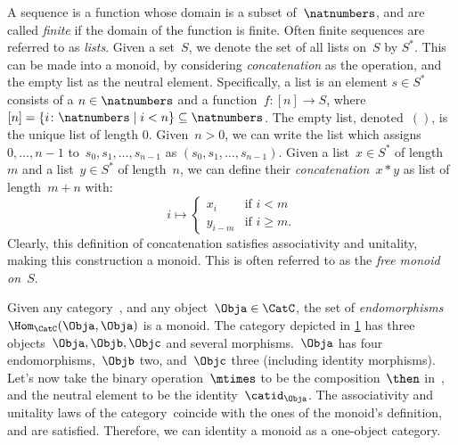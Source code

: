 \begin{example}[Sequences]
  A sequence is a function whose domain is a subset of~$\natnumbers$, and are called \emph{finite} if the domain of the function is finite. Often finite sequences are referred to as \emph{lists}. Given a set~$S$, we denote the set of all lists on~$S$ by $S^\ast$. This can be made into a monoid, by considering \emph{concatenation} as the operation, and the empty list as the neutral element. Specifically, a list is an element $s\in S^\ast$ consists of a $n\in \natnumbers$ and a function~$f\colon [n]\to S$, where~$[n]=\{i\colon \natnumbers\mid i<n\}\subseteq \natnumbers$. The empty list, denoted~$()$, is the unique list of length 0. Given~$n>0$, we can write the list which assigns~$0,\ldots,n-1$ to~$s_0,s_1,\ldots,s_{n-1}$ as $(s_0,s_1,\ldots,s_{n-1})$. Given a list~$x\in S^\ast$ of length~$m$ and a list~$y\in S^\ast$ of length~$n$, we can define their \emph{concatenation}~$x*y$ as list of length~$m+n$ with:
  \begin{equation*}
    i\mapsto
    \begin{cases}
      x_i&\text{if }i<m\\
      y_{i-m}&\text{if }i\geq m.
    \end{cases}
  \end{equation*}
  Clearly, this definition of concatenation satisfies associativity and unitality, making this construction a monoid. This is often referred to as the \emph{free monoid on~$S$}.
\end{example}

\begin{example}
  Given any category~\CatC, and any object~$\Obja\in \CatC$, the set of \emph{endomorphisms}~$\Hom_{\CatC}(\Obja,\Obja)$ is a monoid. The category depicted in \cref{fig:monoid_endomorphisms} has three objects~$\Obja,\Objb,\Objc$ and several morphisms.~$\Obja$ has four endomorphisms,~$\Objb$ two, and~$\Objc$ three (including identity morphisms). Let's now take the binary operation~$\mtimes$ to be the composition~$\then$ in~\CatC, and the neutral element to be the identity~$\catid_\Obja$. The associativity and unitality laws of the category~\CatC coincide with the ones of the monoid's definition, and are satisfied. Therefore, we can identity a monoid as a one-object category.
\end{example}

\begin{figure}[h!]
  \begin{center}
    \caption{}
    \label{fig:monoid_endomorphisms}
  \end{center}
\end{figure}


